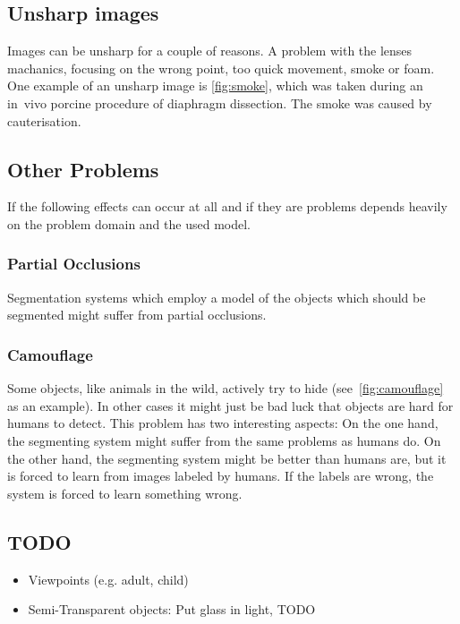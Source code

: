 \subsection{Unsharp images}
Images can be unsharp for a couple of reasons. A problem with the lenses
machanics, focusing on the wrong point, too quick movement, smoke or foam.
One example of an unsharp image is \cref{fig:smoke}, which was taken during an
in~vivo porcine procedure of diaphragm dissection. The smoke was caused by
cauterisation.


\subsection{Other Problems}
If the following effects can occur at all and if they are problems depends
heavily on the problem domain and the used model.

\subsubsection{Partial Occlusions}
Segmentation systems which employ a model of the objects which should be
segmented might suffer from partial occlusions.

\subsubsection{Camouflage}
Some objects, like animals in the wild, actively try to hide
(see~\cref{fig:camouflage} as an example). In other cases it might just be bad
luck that objects are hard for humans to detect. This problem has two
interesting aspects: On the one hand, the segmenting system might suffer from
the same problems as humans do. On the other hand, the segmenting system might
be better than humans are, but it is forced to learn from images labeled by
humans. If the labels are wrong, the system is forced to learn something wrong.



\subsection{TODO}

\begin{itemize}
    \item Viewpoints (e.g. adult, child)
    \item Semi-Transparent objects: Put glass in light, TODO%
\end{itemize}
